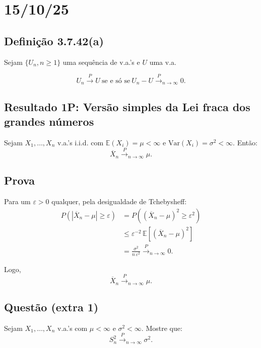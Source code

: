 \section*{15/10/25}

\subsection*{Definição 3.7.42(a)}
Sejam $\{U_n, n \geq 1\}$ uma sequência de v.a.'s e $U$ uma v.a.

\[
U_n \xrightarrow{P} U \ \text{se e só se} \ U_n - U \xrightarrow{P}_{n \to \infty} 0.
\]

\subsection*{Resultado 1P: Versão simples da Lei fraca dos grandes números}
Sejam $X_1, \ldots, X_n$ v.a.'s i.i.d. com $\mathbb{E}(X_i) = \mu < \infty$ e $\mathrm{Var}(X_i) = \sigma^2 < \infty$. Então:
\[
\overline{X}_n \xrightarrow{P}_{n \to \infty} \mu.
\]

\subsection*{Prova}
Para um $\varepsilon > 0$ qualquer, pela desigualdade de Tchebysheff:
\begin{equation}
\begin{aligned}
P\left( \left| \overline{X}_n - \mu \right| \geq \varepsilon \right) &= P\left( \left( \overline{X}_n - \mu \right)^2 \geq \varepsilon^2 \right) \\
&\leq \varepsilon^{-2} \, \mathbb{E} \left[ \left( \overline{X}_n - \mu \right)^2 \right] \\
&= \frac{\sigma^2}{n \, \varepsilon^2} \xrightarrow{P}_{n \to \infty} 0.
\end{aligned}
\end{equation}

Logo,
\[
\overline{X}_n \xrightarrow{P}_{n \to \infty} \mu.
\]

\subsection*{Questão (extra 1)}
Sejam $X_1, \ldots, X_n$ v.a.'s com $\mu < \infty$ e $\sigma^2 < \infty$. Mostre que:
\[
S_n^2 \xrightarrow{P}_{n \to \infty} \sigma^2.
\]